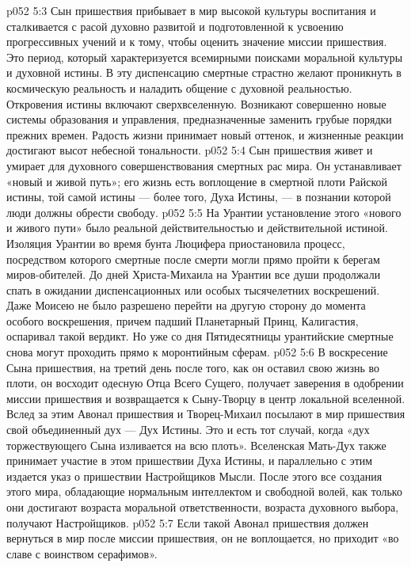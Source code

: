 \vs p052 5:3 \pc Сын пришествия прибывает в мир высокой культуры воспитания и сталкивается с расой духовно развитой и подготовленной к усвоению прогрессивных учений и к тому, чтобы оценить значение миссии пришествия. Это период, который характеризуется всемирными поисками моральной культуры и духовной истины. В эту диспенсацию смертные страстно желают проникнуть в космическую реальность и наладить общение с духовной реальностью. Откровения истины включают сверхвселенную. Возникают совершенно новые системы образования и управления, предназначенные заменить грубые порядки прежних времен. Радость жизни принимает новый оттенок, и жизненные реакции достигают высот небесной тональности.
\vs p052 5:4 Сын пришествия живет и умирает для духовного совершенствования смертных рас мира. Он устанавливает «новый и живой путь»; его жизнь есть воплощение в смертной плоти Райской истины, той самой истины --- более того, Духа Истины, --- в познании которой люди должны обрести свободу.
\vs p052 5:5 На Урантии установление этого «нового и живого пути» было реальной действительностью и действительной истиной. Изоляция Урантии во время бунта Люцифера приостановила процесс, посредством которого смертные после смерти могли прямо пройти к берегам миров\hyp{}обителей. До дней Христа\hyp{}Михаила на Урантии все души продолжали спать в ожидании диспенсационных или особых тысячелетних воскрешений. Даже Моисею не было разрешено перейти на другую сторону до момента особого воскрешения, причем падший Планетарный Принц, Калигастия, оспаривал такой вердикт. Но уже со дня Пятидесятницы урантийские смертные снова могут проходить прямо к моронтийным сферам.
\vs p052 5:6 \pc В воскресение Сына пришествия, на третий день после того, как он оставил свою жизнь во плоти, он восходит одесную Отца Всего Сущего, получает заверения в одобрении миссии пришествия и возвращается к Сыну\hyp{}Творцу в центр локальной вселенной. Вслед за этим Авонал пришествия и Творец\hyp{}Михаил посылают в мир пришествия свой объединенный дух --- Дух Истины. Это и есть тот случай, когда «дух торжествующего Сына изливается на всю плоть». Вселенская Мать\hyp{}Дух также принимает участие в этом пришествии Духа Истины, и параллельно с этим издается указ о пришествии Настройщиков Мысли. После этого все создания этого мира, обладающие нормальным интеллектом и свободной волей, как только они достигают возраста моральной ответственности, возраста духовного выбора, получают Настройщиков.
\vs p052 5:7 Если такой Авонал пришествия должен вернуться в мир после миссии пришествия, он не воплощается, но приходит «во славе с воинством серафимов».
